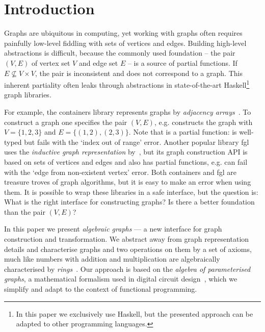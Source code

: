 \section{Introduction}\label{sec-intro}

Graphs are ubiquitous in computing, yet working with graphs often requires
painfully low-level fiddling with sets of vertices and edges. Building
high-level abstractions is difficult, because the commonly used
foundation -- the pair $(V, E)$ of vertex set $V$ and edge set $E$ -- is a source
of partial functions. If $E \nsubseteq V \times V$, the pair is inconsistent and
does not correspond to a graph. This inherent partiality often leaks through
abstractions in state-of-the-art Haskell\footnote{In this paper
we exclusively use Haskell, but the presented approach can be adapted to other
programming languages.} graph libraries.

For example, the \textsf{containers} library represents graphs by
\emph{adjacency arrays}~\cite{1995_king_graphs}. To construct a graph
one specifies the pair $(V,E)$, e.g.
 constructs the graph with $V=\{1,2,3\}$ and
$E=\{(1,2), (2,3)\}$. Note that  is a partial function:
 is well-typed but fails with the
\textsf{`index out of range'} error. Another popular library \textsf{fgl}
uses the \emph{inductive graph representation} by~\citet{2001_erwig_inductive},
but its graph construction API is based on sets of vertices and edges and also
has partial functions, e.g.  can fail with
the \textsf{`edge from non-existent vertex'} error. Both \textsf{containers}
and \textsf{fgl} are treasure troves of graph algorithms, but it is easy to make an
error when using them. It is possible to wrap these libraries in a safe
interface, but the question is: What is the right interface for constructing graphs?
Is there a better foundation than the pair $(V, E)$?

In this paper we present \emph{algebraic graphs} --- a new interface
for graph construction and transformation. We abstract away from graph representation
details and characterise graphs and two operations on them by a set of axioms,
much like numbers with addition and multiplication are algebraically characterised
by \emph{rings}~\cite{1999_maclane_algebra}. Our approach is based on the
\emph{algebra of parameterised graphs}, a mathematical formalism used in digital
circuit design~\cite{2014_algebra_mokhov}, which we simplify and adapt to the
context of functional programming.

